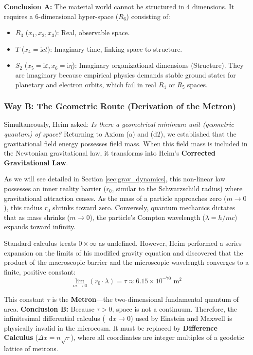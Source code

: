 \documentclass[11pt,a4paper,oneside]{article}
\newcommand{\diff}{\mathop{}\!\mathrm{d}} %
\newcommand{\iu}{\mathrm{i}}              %
\begin{document}
\textbf{Conclusion A:} The material world cannot be structured in 4 dimensions. It requires a 6-dimensional hyper-space ($R_6$) consisting of:
\begin{itemize}
    \item $R_3$ ($x_1, x_2, x_3$): Real, observable space.
    \item $T$ ($x_4 = \iu c t$): Imaginary time, linking space to structure.
    \item $S_2$ ($x_5 = \iu\varepsilon, x_6 = \iu\eta$): Imaginary organizational dimensions (Structure). They are imaginary because empirical physics demands stable ground states for planetary and electron orbits, which fail in real $R_4$ or $R_5$ spaces.
\end{itemize} 

\subsubsection{Way B: The Geometric Route (Derivation of the Metron)}

Simultaneously, Heim asked: \textit{Is there a geometrical minimum unit (geometric quantum) of space?}
Returning to Axiom (a) and (d2), we established that the gravitational field energy possesses field mass. When this field mass is included in the Newtonian gravitational law, it transforms into Heim's \textbf{Corrected Gravitational Law}. 

As we will see detailed in Section \ref{sec:grav_dynamics}, this non-linear law possesses an inner reality barrier ($r_0$, similar to the Schwarzschild radius) where gravitational attraction ceases. As the mass of a particle approaches zero ($m \to 0$), this radius $r_0$ shrinks toward zero. Conversely, quantum mechanics dictates that as mass shrinks ($m \to 0$), the particle's Compton wavelength ($\lambda = h/mc$) expands toward infinity.

Standard calculus treats $0 \times \infty$ as undefined. However, Heim performed a series expansion on the limits of his modified gravity equation and discovered that the product of the macroscopic barrier and the microscopic wavelength converges to a finite, positive constant:
\begin{equation}
    \lim_{m \to 0} (r_0 \cdot \lambda) = \tau \approx 6.15 \times 10^{-70} \text{ m}^2
\end{equation}

This constant $\tau$ is the \textbf{Metron}—the two-dimensional fundamental quantum of area.
\textbf{Conclusion B:} Because $\tau > 0$, space is not a continuum. Therefore, the infinitesimal differential calculus ($\diff x \to 0$) used by Einstein and Maxwell is physically invalid in the microcosm. It must be replaced by \textbf{Difference Calculus} ($\Delta x = n \sqrt{\tau}$), where all coordinates are integer multiples of a geodetic lattice of metrons.
\end{document}
